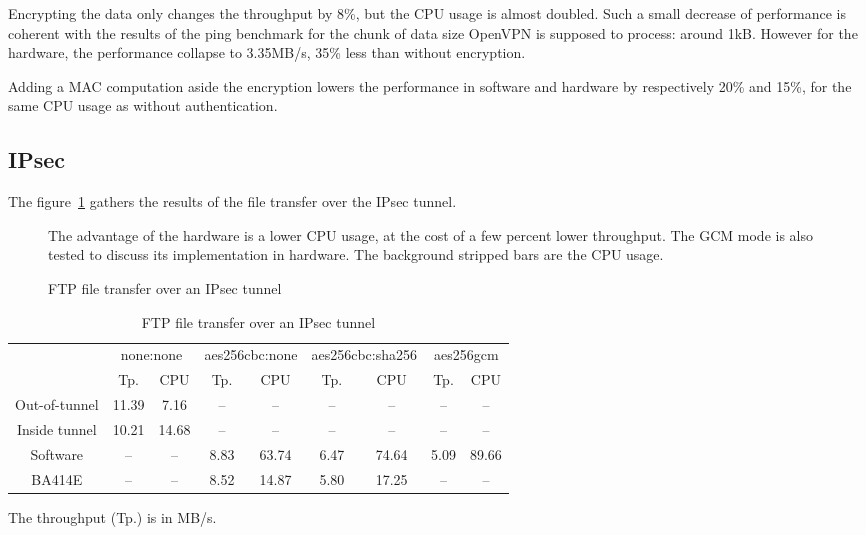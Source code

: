 \noindent Encrypting the data only changes the throughput by 8\%, but the CPU usage is almost doubled.
Such a small decrease of performance is coherent with the results of the ping benchmark for the chunk of data size OpenVPN is supposed to process: around 1kB.
However for the hardware, the performance collapse to 3.35MB/s, 35\% less than without encryption.

Adding a MAC computation aside the encryption lowers the performance in software and hardware by respectively 20\% and 15\%, for the same CPU usage as without authentication.


\subsection{IPsec}
The figure~\ref{fig:ipsec-ftp-bench} gathers the results of the file transfer over the IPsec tunnel.
\begin{figure}[ht]

\caption{FTP file transfer over an IPsec tunnel}{The advantage of the hardware is a lower CPU usage, at the cost of a few percent lower throughput. The GCM mode is also tested to discuss its implementation in hardware. The background stripped bars are the CPU usage.}
\label{fig:ipsec-ftp-bench}
\end{figure}

\begin{table}[ht]
\center
\small
\begin{tabular}{l|c|c|c|c|c|c|c|c|} \cline{2-9}
 & \multicolumn{2}{c|}{none:none} & \multicolumn{2}{c|}{aes256cbc:none} & \multicolumn{2}{c|}{aes256cbc:sha256} & \multicolumn{2}{c|}{aes256gcm} \\ \cline{2-9}
 & Tp.  & CPU & Tp.  & CPU & Tp.  & CPU & Tp.  & CPU \\ \hline
\multicolumn{1}{|c|}{Out-of-tunnel} & 11.39 & 7.16 & -- & -- & -- & -- & -- & -- \\ \hline
\multicolumn{1}{|c|}{Inside tunnel} & 10.21 & 14.68 & -- & -- & -- & -- & -- & -- \\ \hline
\multicolumn{1}{|c|}{Software} & -- & -- & 8.83 & 63.74 & 6.47 & 74.64 & 5.09 & 89.66 \\ \hline
\multicolumn{1}{|c|}{BA414E} & -- & -- & 8.52 & 14.87 & 5.80 & 17.25 & -- & -- \\ \hline
\end{tabular}
\caption{FTP file transfer over an IPsec tunnel}{The throughput (Tp.) is in MB/s.}
\label{tab:ipsec-ftp-bench}
\end{table}

